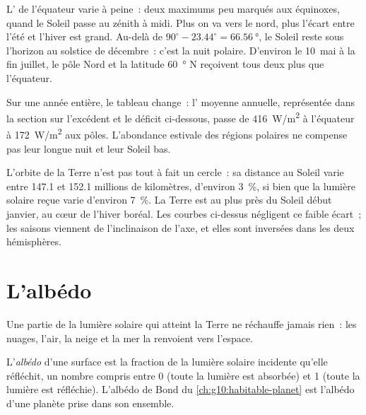 \begin{remark}\label{rem:g10:earth-energy-budget:curves}
L' de l'équateur varie à peine~: deux maximums peu marqués aux
équinoxes, quand le Soleil passe au zénith à midi. Plus on va vers le nord,
plus l'écart entre l'été et l'hiver est grand. Au-delà de
$90^\circ - 23.44^\circ = \qty{66.56}{\degree}$, le Soleil reste sous
l'horizon au solstice de décembre~: c'est la nuit polaire. D'environ le
10~mai à la fin juillet, le pôle Nord et la latitude \qty{60}{\degree} N
reçoivent tous deux plus que l'équateur.
\end{remark}

Sur une année entière, le tableau change~: l' moyenne annuelle,
représentée dans la section sur l'excédent et le déficit ci-dessous, passe
de \qty{416}{W/m^2} à l'équateur à \qty{172}{W/m^2} aux pôles. L'abondance
estivale des régions polaires ne compense pas leur longue nuit et leur
Soleil bas.

\begin{remark}\label{rem:g10:earth-energy-budget:distance}
L'orbite de la Terre n'est pas tout à fait un cercle~: sa distance au
Soleil varie entre \num{147.1} et \num{152.1} millions de kilomètres,
d'environ \qty{3}{\percent}, si bien que la lumière solaire reçue varie
d'environ \qty{7}{\percent}. La Terre est au plus près du Soleil début
janvier, au cœur de l'hiver boréal. Les courbes ci-dessus négligent ce
faible écart~; les saisons viennent de l'inclinaison de l'axe, et elles
sont inversées dans les deux hémisphères.
\end{remark}

\section{L'albédo}

Une partie de la lumière solaire qui atteint la Terre ne réchauffe jamais
rien~: les nuages, l'air, la neige et la mer la renvoient vers l'espace.

\begin{definition}[Albédo]\label{def:g10:earth-energy-budget:albedo}
L'\emph{albédo} d'une surface est la fraction de la
lumière solaire incidente qu'elle réfléchit, un nombre compris entre 0
(toute la lumière est absorbée) et 1 (toute la lumière est réfléchie).
L'albédo de Bond du \cref{ch:g10:habitable-planet} est l'albédo d'une
planète prise dans son ensemble.
\end{definition}

